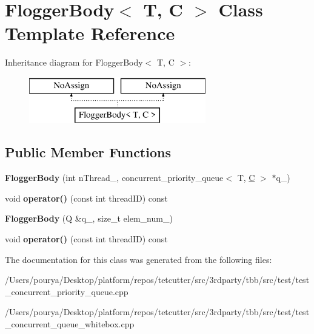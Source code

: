 \hypertarget{classFloggerBody}{}\section{Flogger\+Body$<$ T, C $>$ Class Template Reference}
\label{classFloggerBody}
Inheritance diagram for Flogger\+Body$<$ T, C $>$\+:\begin{figure}[H]
\begin{center}
\leavevmode
\includegraphics[height=2.000000cm]{classFloggerBody}
\end{center}
\end{figure}
\subsection*{Public Member Functions}
\begin{DoxyCompactItemize}
\item 
\hypertarget{classFloggerBody_aaa676e3a6588f3e0cf938dd6d7534be8}{}{\bfseries Flogger\+Body} (int n\+Thread\+\_\+, concurrent\+\_\+priority\+\_\+queue$<$ T, \hyperlink{classC}{C} $>$ $\ast$q\+\_\+)\label{classFloggerBody_aaa676e3a6588f3e0cf938dd6d7534be8}

\item 
\hypertarget{classFloggerBody_a82c15d542b60cf7c153e30a65b4473a3}{}void {\bfseries operator()} (const int thread\+I\+D) const \label{classFloggerBody_a82c15d542b60cf7c153e30a65b4473a3}

\item 
\hypertarget{classFloggerBody_a46f90d72a11987596a6fe03080baf1c8}{}{\bfseries Flogger\+Body} (Q \&q\+\_\+, size\+\_\+t elem\+\_\+num\+\_\+)\label{classFloggerBody_a46f90d72a11987596a6fe03080baf1c8}

\item 
\hypertarget{classFloggerBody_a82c15d542b60cf7c153e30a65b4473a3}{}void {\bfseries operator()} (const int thread\+I\+D) const \label{classFloggerBody_a82c15d542b60cf7c153e30a65b4473a3}

\end{DoxyCompactItemize}


The documentation for this class was generated from the following files\+:\begin{DoxyCompactItemize}
\item 
/\+Users/pourya/\+Desktop/platform/repos/tetcutter/src/3rdparty/tbb/src/test/test\+\_\+concurrent\+\_\+priority\+\_\+queue.\+cpp\item 
/\+Users/pourya/\+Desktop/platform/repos/tetcutter/src/3rdparty/tbb/src/test/test\+\_\+concurrent\+\_\+queue\+\_\+whitebox.\+cpp\end{DoxyCompactItemize}
